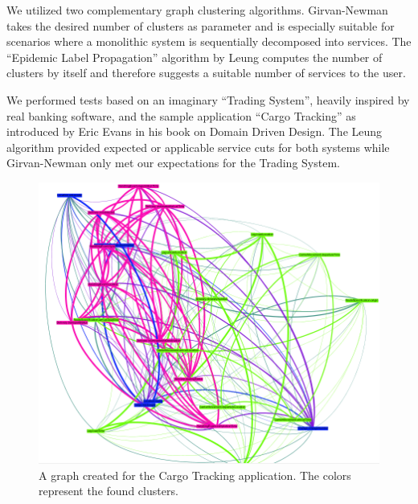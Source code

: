 \begin{minipage}[t]{0.6\textwidth}
	\setlength{\parskip}{5pt plus 0.1pt}
We utilized two complementary graph clustering algorithms. Girvan-Newman takes the desired number of clusters as parameter and is especially suitable for scenarios where a monolithic system is sequentially decomposed into services. The \enquote{Epidemic Label Propagation} algorithm by Leung computes the number of clusters by itself and therefore suggests a suitable number of services to the user. 

We performed tests based on an imaginary \enquote{Trading System}, heavily inspired by real banking software, and the sample application \enquote{Cargo Tracking} as introduced by Eric Evans in his book on Domain Driven Design. The Leung algorithm provided expected or applicable service cuts for both systems while Girvan-Newman only met our expectations for the Trading System. 
\end{minipage}
\begin{minipage}[t]{0.4\textwidth}	
	\begin{figure}[H]
		\begin{center}
			\includegraphics[scale=0.3]{images/ddd_semantic_proximity_debug.png}
			\caption{A graph created for the Cargo Tracking application. The colors represent the found clusters.}
			\label{fig:mgmt-summary-graph}
		\end{center}
	\end{figure}
\end{minipage}

